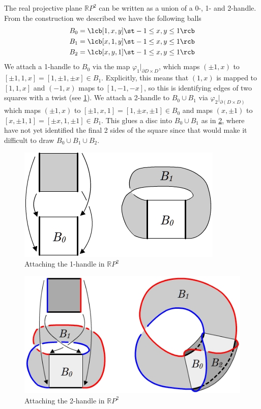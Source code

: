 \begin{example}
The real projective plane $\mathbb RP^2$ can be written as a union of a 0-, 1- and 2-handle. From the construction we described we have the following balls
\begin{align*}
B_0 &= \lcb [1,x,y] \st -1 \leq x,y \leq 1 \rcb \\
B_1 &= \lcb [x,1,y] \st -1 \leq x,y \leq 1 \rcb \\
B_2 &= \lcb [x,y,1] \st -1 \leq x,y \leq 1 \rcb 
\end{align*}
We attach a 1-handle to $B_0$ via the map $\varphi_1|_{\partial D \times D}$, which maps $(\pm 1,x)$ to $[\pm 1,1,x] = [1,\pm 1,\pm x] \in B_1$. Explicitly, this means that $(1,x)$ is mapped to $[1,1,x]$ and $(-1,x)$ maps to $[1,-1,-x]$, so this is identifying edges of two squares with a twist (see \cref{rp2-attach-1-handle}). We attach a 2-handle to $B_0 \cup B_1$ via $\varphi_2|_{\partial(D \times D)}$ which maps $(\pm 1,x)$ to $[\pm 1,x,1] = [1,\pm x,\pm 1] \in B_0$ and maps $(x,\pm 1)$ to $[x,\pm 1,1] = [\pm x,1,\pm 1] \in B_1$. This glues a disc into $B_0 \cup B_1$ as in \cref{rp2-attach-2-handle}, where have not yet identified the final 2 sides of the square since that would make it difficult to draw $B_0 \cup B_1 \cup B_2$.


\begin{figure}[tb]
\centering
\includegraphics[scale=.6]{graphics/rp2-attach-1-handle}
\caption{Attaching the 1-handle in $\mathbb RP^2$}
\label{rp2-attach-1-handle}
\end{figure}



\begin{figure}[tb]
\centering
\includegraphics[scale=.65]{graphics/rp2-attach-2-handle}
\caption{Attaching the 2-handle in $\mathbb RP^2$}
\label{rp2-attach-2-handle}
\end{figure}


\end{example}
